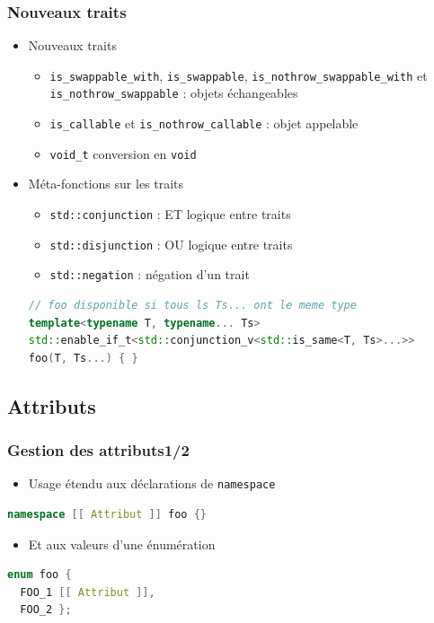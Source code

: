 \documentclass[C++.tex]{subfiles}
\begin{document}
\begin{frame}[fragile]
	\frametitle{Nouveaux traits}
	\begin{itemize}
		\item Nouveaux traits
		\begin{itemize}
			\item \lstinline|is_swappable_with|, \lstinline|is_swappable|, \lstinline|is_nothrow_swappable_with| et \lstinline|is_nothrow_swappable| : objets échangeables
			\item \lstinline|is_callable| et \lstinline|is_nothrow_callable| : objet appelable
			\item \lstinline|void_t| conversion en \lstinline|void|


		\end{itemize}
		\item Méta-fonctions sur les traits
		\begin{itemize}
			\item \lstinline|std::conjunction| : \og ET\fg{} logique entre traits
			\item \lstinline|std::disjunction| : \og OU\fg{} logique entre traits
			\item \lstinline|std::negation| : négation d'un trait
		\end{itemize}

	\begin{lstlisting}[language=C++]
// foo disponible si tous ls Ts... ont le meme type
template<typename T, typename... Ts>
std::enable_if_t<std::conjunction_v<std::is_same<T, Ts>...>>
foo(T, Ts...) { }\end{lstlisting}
	\end{itemize}
\end{frame}

\subsection*{Attributs}
\begin{frame}[fragile]
	\frametitle{Gestion des attributs\titlehfill{}1/2}
	\begin{itemize}
		\item Usage étendu aux déclarations de \lstinline|namespace|
	\end{itemize}

	\begin{lstlisting}[language=C++]
namespace [[ Attribut ]] foo {}\end{lstlisting}

	\begin{itemize}
		\item Et aux valeurs d'une énumération
	\end{itemize}

	\begin{lstlisting}[language=C++]
enum foo {
  FOO_1 [[ Attribut ]],
  FOO_2 };\end{lstlisting}
\end{frame}
\end{document}
